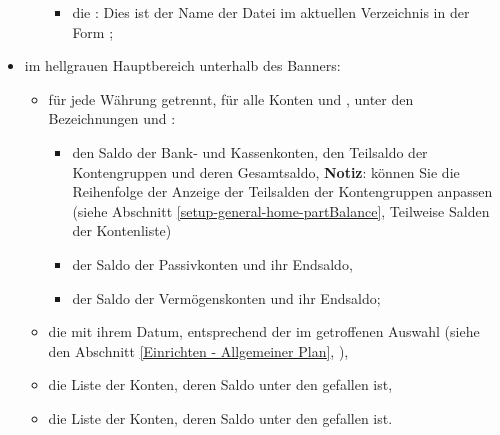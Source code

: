 \begin{itemize}
\begin{itemize}
\begin{itemize}
			 		\item die : Dies ist der Name der Datei im aktuellen Verzeichnis in der Form ;%
			 	\end{itemize}
		\end{itemize}
	\item im hellgrauen Hauptbereich unterhalb des Banners:%
	 	\begin{itemize}
	 		\item für jede Währung getrennt, für alle Konten und , unter den Bezeichnungen  und :%
				\begin{itemize}
					\item den Saldo der Bank- und Kassenkonten, den Teilsaldo der Kontengruppen und deren Gesamtsaldo,%
					\newline
					\textbf{Notiz}: können Sie die Reihenfolge der Anzeige der Teilsalden der Kontengruppen anpassen (siehe Abschnitt \vref{setup-general-home-partBalance}, Teilweise Salden der Kontenliste)%
					\item der Saldo der Passivkonten und ihr Endsaldo,%
					\item der Saldo der Vermögenskonten und ihr Endsaldo;%
				\end{itemize}
			\item die  mit ihrem Datum, entsprechend der im  getroffenen Auswahl (siehe den Abschnitt \vref{Einrichten - Allgemeiner Plan}, ),%
			\item die Liste der Konten, deren Saldo unter den  gefallen ist,%
			\item die Liste der Konten, deren Saldo unter den  gefallen ist.%
		\end{itemize}
\end{itemize}

